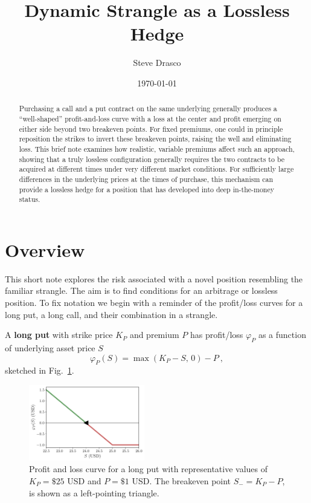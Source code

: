 \documentclass[aps,reprint]{revtex4-2}
\begin{document}
\title{Dynamic Strangle as a Lossless Hedge}
\author{Steve Drasco}
\date{\today}

\begin{abstract}
Purchasing a call and a put contract on the same underlying generally produces a “well-shaped” profit-and-loss curve with a loss at the center and profit emerging on either side beyond two breakeven points. For fixed premiums, one could in principle reposition the strikes to invert these breakeven points, raising the well and eliminating loss. This brief note examines how realistic, variable premiums affect such an approach, showing that a truly lossless configuration generally requires the two contracts to be acquired at different times under very different market conditions. For sufficiently large differences in the underlying prices at the times of purchase, this mechanism can provide a lossless hedge for a position that has developed into deep in-the-money status.
\end{abstract}

\maketitle

\section{Overview}

This short note explores the risk associated with a novel position resembling the familiar strangle.  The aim is to find conditions for an arbitrage or lossless position.  To fix notation we begin with a reminder of the profit/loss curves for a long put, a long call, and their combination in a strangle. 

A \textbf{long put} with strike price $K_P$ and premium $P$ has profit/loss $\varphi_P$ as a function of underlying asset price $S$
\begin{equation}
\varphi_P(S) = \max(K_P - S,\,0) - P~,
\end{equation}
sketched in Fig.~\ref{fig:put}.
\begin{figure}[hb]
    \centering
    \includegraphics[width=0.45\textwidth]{figs/put.pdf}
    \caption{Profit and loss curve for a long put with representative values of $K_P = \$25$ USD and $P = \$1$ USD.  The breakeven point $S_- = K_P - P$, is shown as a left-pointing triangle.}
    \label{fig:put}
\end{figure}
\end{document}
